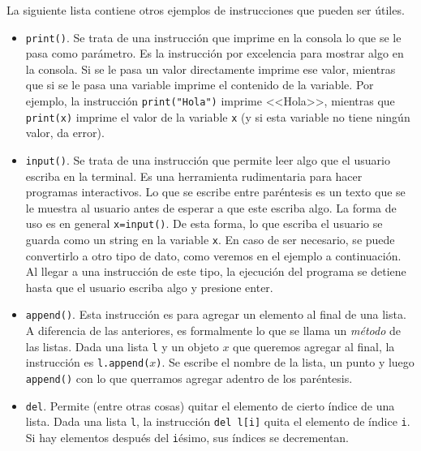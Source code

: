 \documentclass[a4paper, 12pt]{report}
\theoremstyle{definition}
\begin{document}
La siguiente lista contiene otros ejemplos de instrucciones que pueden ser útiles.
\begin{itemize}
	\item {\tt print()}. Se trata de una instrucción que imprime en la consola lo que se le pasa como parámetro. Es la instrucción por excelencia para mostrar algo en la consola. Si se le pasa un valor directamente imprime ese valor, mientras que si se le pasa una variable imprime el contenido de la variable. Por ejemplo, la instrucción {\tt print("Hola")} imprime <<Hola>>, mientras que {\tt print(x)} imprime el valor de la variable {\tt x} (y si esta variable no tiene ningún valor, da error).
	
	\item {\tt input()}. Se trata de una instrucción que permite leer algo que el usuario escriba en la terminal. Es una herramienta rudimentaria para hacer programas interactivos. Lo que se escribe entre paréntesis es un texto que se le muestra al usuario antes de esperar a que este escriba algo. La forma de uso es en general  {\tt x=input()}. De esta forma, lo que escriba el usuario se guarda como un string en la variable {\tt x}. En caso de ser necesario, se puede convertirlo a otro tipo de dato, como veremos en el ejemplo a continuación. Al llegar a una instrucción de este tipo, la ejecución del programa se detiene hasta que el usuario escriba algo y presione enter.
	
	\item {\tt append()}. Esta instrucción es para agregar un elemento al final de una lista. A diferencia de las anteriores, es formalmente lo que se llama un {\sl método} de las listas. Dada una lista {\tt l} y un objeto $x$ que queremos agregar al final, la instrucción es {\tt l.append($x$)}. Se escribe el nombre de la lista, un punto y luego {\tt append()} con lo que querramos agregar adentro de los paréntesis. 
	
	\item {\tt del}. Permite (entre otras cosas) quitar el elemento de cierto índice de una lista. Dada una lista {\tt l}, la instrucción {\tt del l[i]} quita el elemento de índice {\tt i}. Si hay elementos después del {\tt i}ésimo, sus índices se decrementan.
\end{itemize}
\end{document}
